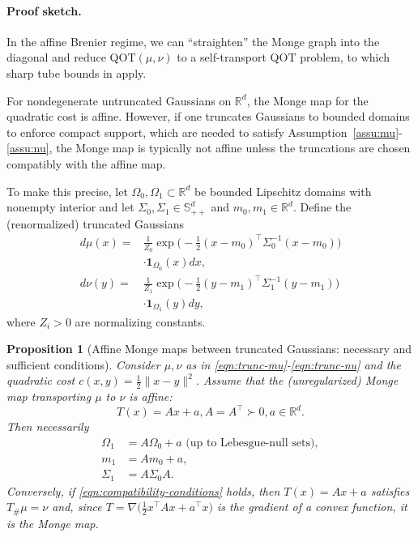 \documentclass{article}
\theoremstyle{plain}
\newtheorem{proposition}[theorem]{Proposition}
\theoremstyle{definition}
\theoremstyle{remark}
\numberwithin{equation}{section}
\newcommand{\R}{\mathbb{R}}
\begin{document}
\paragraph{Proof sketch.}
In the affine Brenier regime, we can ``straighten'' the Monge graph into the diagonal and reduce QOT$(\mu,\nu)$ to a self-transport QOT problem, to which sharp tube bounds in \citealp[Theorem~3.1,~3.4]{wiesel2025sparsity} apply.

For nondegenerate untruncated Gaussians on $\R^d$, the Monge map for the quadratic cost is affine.
However, if one truncates Gaussians to bounded domains to enforce compact support, which are needed to satisfy Assumption~\ref{assu:mu}-\ref{assu:nu}, the Monge map is typically not affine unless the truncations are chosen compatibly with the affine map.

To make this precise, let $\Omega_0,\Omega_1\subset\R^d$ be bounded Lipschitz domains with nonempty interior and let $\Sigma_0,\Sigma_1\in\mathbb S_{++}^d$ and $m_0,m_1\in\R^d$.
Define the (renormalized) truncated Gaussians
\begin{align}
d\mu(x)=&\frac{1}{Z_0}\exp\Big(-\frac12(x-m_0)^\top\Sigma_0^{-1}(x-m_0)\Big)\nonumber\\
&\cdot\mathbf1_{\Omega_0}(x)dx,\label{eqn:trunc-mu}\\
d\nu(y)=&\frac{1}{Z_1}\exp\Big(-\frac12(y-m_1)^\top\Sigma_1^{-1}(y-m_1)\Big)\nonumber\\
&\cdot\mathbf1_{\Omega_1}(y)dy,\label{eqn:trunc-nu}
\end{align}
where $Z_i>0$ are normalizing constants.
\begin{proposition}[Affine Monge maps between truncated Gaussians: necessary and sufficient conditions]
\label{prop:trunc-gauss-affine}
Consider $\mu,\nu$ as in \eqref{eqn:trunc-mu}-\eqref{eqn:trunc-nu} and the quadratic cost $c(x,y)=\frac12\|x-y\|^2$.
Assume that the (unregularized) Monge map transporting $\mu$ to $\nu$ is affine:
\begin{equation}\label{eqn:affine-brenier-trunc}
T(x)=Ax+a,A=A^\top\succ0,a\in\R^d.
\end{equation}
Then necessarily
\begin{equation}\label{eqn:compatibility-conditions}
\begin{aligned}
\Omega_1&=A\Omega_0+a\text{ (up to Lebesgue-null sets)},\\
m_1&=Am_0+a,\\
\Sigma_1&=A\Sigma_0A.
\end{aligned}
\end{equation}
Conversely, if \eqref{eqn:compatibility-conditions} holds, then $T(x)=Ax+a$ satisfies $T_\#\mu=\nu$ and, since $T=\nabla\big(\frac12 x^\top Ax+a^\top x\big)$ is the gradient of a convex function, it is the Monge map.
\end{proposition}
\end{document}
